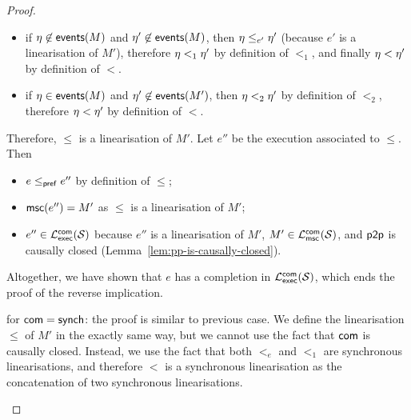 \begin{proof}
\begin{description}
\begin{itemize}
            \item if $\eta\not\in\mathsf{events}(M)$ and $\eta'\not\in\mathsf{events}(M)$,
            then $\eta\mathrel{\leq_{e'}} \eta'$ (because $e'$ is a linearisation of $M'$), 
            therefore $\eta <_1 \eta'$ by definition of $<_1$, and finally $\eta < \eta'$ by definition of $<$.

            \item if $\eta\in\mathsf{events}(M)$ and $\eta'\not\in\mathsf{events}(M')$,
            then $\eta<_2 \eta'$ by definition of $<_2$, therefore $\eta < \eta'$ by definition of $<$.
        \end{itemize}
        Therefore, $\leq$ is a linearisation of $M'$. Let $e''$ be the execution associated to $\leq$.
        Then
        \begin{itemize}
            \item $e\mathrel{\leq_{\mathsf{pref}}} e''$ by definition of $\leq$;
            \item $\mathsf{msc}(e'')=M'$ as $\leq$ is a linearisation of $M'$;
            \item $e''\in\mathcal{L}_{\mathsf{exec}}^{\mathsf{com}}(\mathcal{S})$ because $e''$ is a linearisation of $M'$, $M'\in\mathcal{L}_{\mathsf{msc}}^{\mathsf{com}}(\mathcal{S})$,
            and $\mathsf{p2p}$ is causally closed (Lemma~\ref{lem:pp-is-causally-closed}).
        \end{itemize}
        Altogether, we have shown that $e$ has a completion in $\mathcal{L}_{\mathsf{exec}}^{\mathsf{com}}(\mathcal{S})$, which ends the proof of 
        the reverse implication.

        \item[$\Leftarrow$:]   for $\mathsf{com}=\mathsf{synch}$:
            the proof is similar to previous case. We define the linearisation $\leq$ of $M'$ 
            in the exactly  same way, but we cannot use the fact that $\mathsf{com}$ is causally closed.
            Instead, we use the fact that both $<_e$ and  $<_1$ are synchronous linearisations,
            and therefore $<$ is a synchronous linearisation as the concatenation of two synchronous linearisations.

    \end{description}
\end{proof}